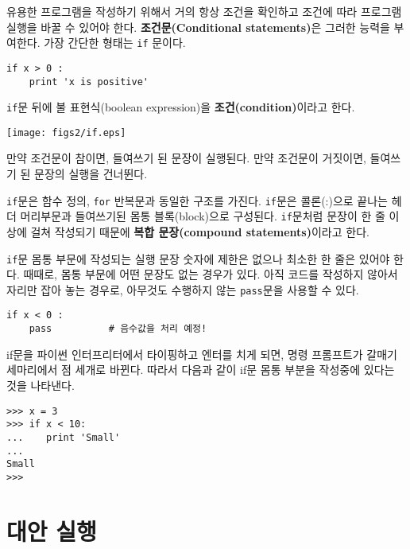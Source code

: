 유용한 프로그램을 작성하기 위해서 거의 항상 조건을 확인하고 조건에 따라 프로그램 실행을 바꿀 수 있어야 한다.
{\bf 조건문(Conditional statements)}은 그러한 능력을 부여한다. 
가장 간단한 형태는  {\tt if} 문이다.

\beforeverb
\begin{verbatim}
if x > 0 :
    print 'x is positive'
\end{verbatim}
\afterverb
%
{\tt if}문 뒤에 불 표현식(boolean expression)을 {\bf 조건(condition)}이라고 한다.

\beforefig
\centerline{\texttt{[image: figs2/if.eps]}}
\afterfig

만약 조건문이 참이면, 들여쓰기 된 문장이 실행된다. 
만약 조건문이 거짓이면, 들여쓰기 된 문장의 실행을 건너뛴다.


{\tt if}문은 함수 정의, {\tt for} 반복문과 동일한 구조를 가진다.
{\tt if}문은 콜론(:)으로 끝나는 헤더 머리부문과 들여쓰기된 몸통 블록(block)으로 구성된다.
{\tt if}문처럼 문장이 한 줄 이상에 걸쳐 작성되기 때문에 {\bf 복합 문장(compound statements)}이라고 한다.

{\tt if}문 몸통 부문에 작성되는 실행 문장 숫자에 제한은 없으나 최소한 한 줄은 있어야 한다.
때때로, 몸통 부문에 어떤 문장도 없는 경우가 있다. 
아직 코드를 작성하지 않아서 자리만 잡아 놓는 경우로, 아무것도 수행하지 않는 {\tt pass}문을 사용할 수 있다.


\beforeverb
\begin{verbatim}
if x < 0 :
    pass          # 음수값을 처리 예정!
\end{verbatim}
\afterverb
%
if문을 파이썬 인터프리터에서 타이핑하고 엔터를 치게 되면, 
명령 프롬프트가 갈매기 세마리에서 점 세개로 바뀐다. 
따라서 다음과 같이 if문 몸통 부분을 작성중에 있다는 것을 나타낸다.

\beforeverb
\begin{verbatim}
>>> x = 3
>>> if x < 10:
...    print 'Small'
... 
Small
>>>
\end{verbatim}
\afterverb
%

\section{대안 실행}

